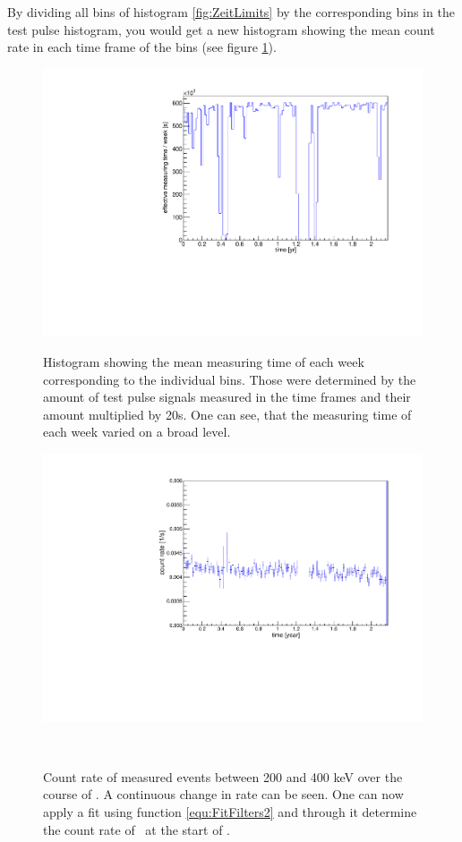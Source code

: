 \documentclass[encoding=utf8,british]{tumphthesis}
\begin{document}
By dividing all bins of histogram \ref{fig:ZeitLimits} by the corresponding bins in the test pulse histogram, you would get a new histogram showing the mean count rate in each time frame of the bins (see figure \ref{fig:ChangeInEventRate}).
\\
\begin{figure}[t!]
	\centering
	\begin{minipage}[t]{.475\textwidth}
		\centering
		\includegraphics[width=\textwidth]{./Bilder/testpuler.pdf}
		\caption{
			Histogram showing the mean measuring time of each week corresponding to the individual bins.
			Those were determined by the amount of test pulse signals measured in the time frames and their amount multiplied by 20s.
			One can see, that the measuring time of each week varied on a broad level.
			}
		\label{fig:effectiveMeasuringTimes}
	\end{minipage}\hfill%
	\begin{minipage}[t]{.475\textwidth}
		\centering
		\includegraphics[width=\textwidth]{./Bilder/eventRate.pdf}
		\caption{
			Count rate of measured events between 200 and 400 keV over the course of \PII.
			A continuous change in rate can be seen. 
			One can now apply a fit using function \ref{equ:FitFilters2} and through it determine the count rate of \Kr\ at the start of \PII.
			}
		\label{fig:ChangeInEventRate}
	\end{minipage}
	\\
\end{figure}
\end{document}
